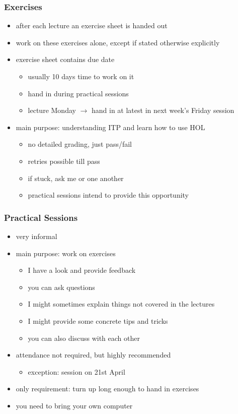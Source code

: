 \begin{frame}
\frametitle{Exercises}

\begin{itemize}
\item after each lecture an exercise sheet is handed out
\item work on these exercises alone, except if stated otherwise explicitly
\item exercise sheet contains due date
\begin{itemize}
\item usually 10 days time to work on it
\item hand in during practical sessions
\item lecture Monday $\longrightarrow$ hand in at latest in next week's Friday session
\end{itemize}
\item main purpose: understanding ITP and learn how to use HOL
\begin{itemize}
\item no detailed grading, just pass/fail 
\item retries possible till pass
\item if stuck, ask me or one another
\item practical sessions intend to provide this opportunity 
\end{itemize}
\end{itemize}
\end{frame}


\begin{frame}
\frametitle{Practical Sessions}

\begin{itemize}
\item very informal
\item main purpose: work on exercises
\begin{itemize}
\item I have a look and provide feedback
\item you can ask questions
\item I might sometimes explain things not covered in the lectures
\item I might provide some concrete tips and tricks
\item you can also discuss with each other
\end{itemize}
\item attendance not required, but highly recommended
\begin{itemize}
\item exception: session on 21st April
\end{itemize}
\item only requirement: turn up long enough to hand in exercises
\item \alert{you need to bring your own computer}
\end{itemize}
\end{frame}


